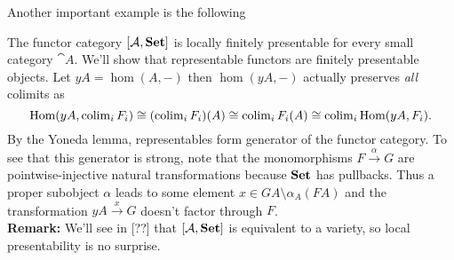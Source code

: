 Another important example is the following
\begin{Example}\label{ex:representablepresentable}
The functor category $[\mathcal{A},\mathbf{Set}]$ is locally finitely presentable for every small category $\cat A$. We'll show that representable functors are finitely presentable objects. Let $yA = \hom(A,-)$ then $\hom(yA,-)$ actually preserves \emph{all} colimits as 
\[ \textrm{Hom}(yA, \operatorname{colim}_i F_i) \cong (\operatorname{colim}_i F_i)(A) \cong \operatorname{colim}_i F_i(A) \cong \operatorname{colim}_i \textrm{Hom}(yA, F_i). \]
By the Yoneda lemma, representables form generator of the functor category. To see that this generator is strong, note that the monomorphisms $F \xrightarrow{\alpha} G$ are pointwise-injective natural transformations because $\mathbf{Set}$ has pullbacks. Thus a proper subobject $\alpha$ leads to some element $x \in GA \setminus \alpha_A(FA)$ and the transformation $yA \xrightarrow{x} G$ doesn't factor through $F$. \\

\textbf{Remark: } We'll see in [??] that $[\mathcal{A},\mathbf{Set}]$ is equivalent to a variety, so local presentability is no surprise.
\end{Example}

